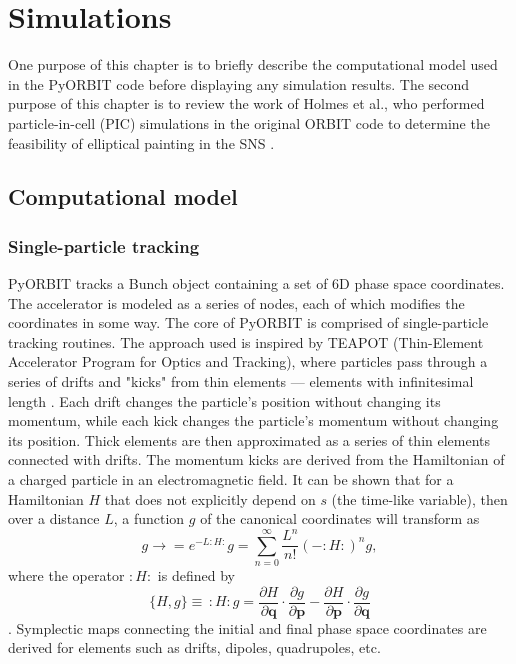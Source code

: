 \chapter{Simulations} \label{chap-3}

One purpose of this chapter is to briefly describe the computational model used in the PyORBIT code \cite{Shishlo2015} before displaying any simulation results. The second purpose of this chapter is to review the work of Holmes et al., who performed particle-in-cell (PIC) simulations in the original ORBIT code to determine the feasibility of elliptical painting in the SNS \cite{Holmes2018}.



\section{Computational model}

\subsection{Single-particle tracking}

PyORBIT tracks a Bunch object containing a set of 6D phase space coordinates. The accelerator is modeled as a series of nodes, each of which modifies the coordinates in some way. The core of PyORBIT is comprised of single-particle tracking routines. The approach used is inspired by TEAPOT (Thin-Element Accelerator Program for Optics and Tracking), where particles pass through a series of drifts and "kicks" from thin elements — elements with infinitesimal length \cite{Schachinger1987}. Each drift changes the particle's position without changing its momentum, while each kick changes the particle's momentum without changing its position. Thick elements are then approximated as a series of thin elements connected with drifts. The momentum kicks are derived from the Hamiltonian of a charged particle in an electromagnetic field. It can be shown that for a Hamiltonian $H$ that does not explicitly depend on $s$ (the time-like variable), then over a distance $L$, a function $g$ of the canonical coordinates will transform as
%
\begin{equation}
    g \rightarrow 
    = e^{-L:H:} g
    = \sum_{n=0}^{\infty}{\frac{L^n}{n!} (-:H:)^n g},
\end{equation}
%
where the operator $:H:$ is defined by
%
\begin{equation}
    \{H, g\} \equiv \, :H: g =
    \frac{\partial{H}}{\partial{\mathbf{q}}}
    \cdot
    \frac{\partial{g}}{\partial{\mathbf{p}}}
    -
    \frac{\partial{H}}{\partial{\mathbf{p}}}
    \cdot
    \frac{\partial{g}}{\partial{\mathbf{q}}}
\end{equation}
%
\cite{Dragt2018, Forest1998}. Symplectic maps connecting the initial and final phase space coordinates are derived for elements such as drifts, dipoles, quadrupoles, etc.

